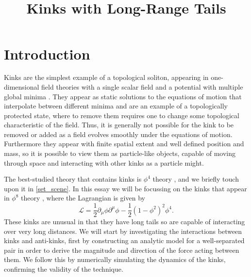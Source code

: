 \documentclass[11pt, oneside,titlepage]{article}  	%
\title{Kinks with Long-Range Tails}
\date{}							%
\numberwithin{equation}{section}
\begin{document}
\maketitle


\section{Introduction}
Kinks are the simplest example of a topological soliton, appearing in one-dimensional field theories with a single scalar field and a potential with multiple global minima \cite{manton-book,rajaraman}. They appear as static solutions to the equations of motion that interpolate between different minima and are an example of a topologically protected state, where to remove them requires one to change some topological characteristic of the field. Thus, it is generally not possible for the kink to be removed or added as a field evolves smoothly under the equations of motion. Furthermore they appear with finite spatial extent and well defined position and mass, so it is possible to view them as particle-like objects, capable of moving through space and interacting with other kinks as a particle might.\par
The best-studied theory that contains kinks is $\phi^4$ theory \cite{kink-review,lohe,Goodman}, and we briefly touch upon it in \textsection \ref{set_scene}. In this essay we will be focussing on the kinks that appear in $\phi^8$ theory \cite{manton-paper,christov-proper}, where the Lagrangian is given by 
\begin{equation}
\mathcal{L} = \frac{1}{2} \partial_\mu \phi \partial^\mu \phi  - \frac{1}{2} \left ( 1- \phi^2 \right )^2 \phi^4.
\end{equation}
These kinks are unusual in that they have long tails so are capable of interacting over very long distances. We will start by investigating the interactions between kinks and anti-kinks, first by constructing an analytic model for a well-separated pair in order to derive the magnitude and direction of the force acting between them. We follow this by numerically simulating the dynamics of the kinks, confirming the validity of the technique.\par
\end{document}

